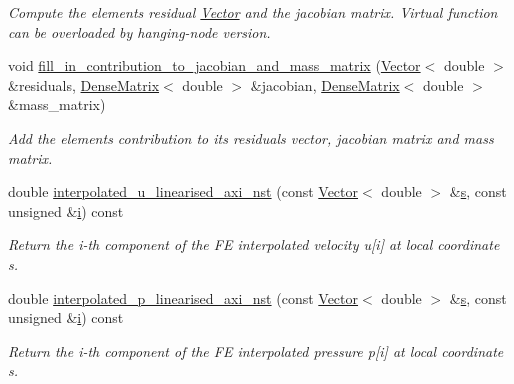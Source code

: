 \begin{DoxyCompactItemize}
\begin{DoxyCompactList}\small\item\em Compute the element\textquotesingle{}s residual \hyperlink{classoomph_1_1Vector}{Vector} and the jacobian matrix. Virtual function can be overloaded by hanging-\/node version. \end{DoxyCompactList}\item 
void \hyperlink{classoomph_1_1LinearisedAxisymmetricNavierStokesEquations_a3dc10c4b27bee432c8536a7213c70050}{fill\+\_\+in\+\_\+contribution\+\_\+to\+\_\+jacobian\+\_\+and\+\_\+mass\+\_\+matrix} (\hyperlink{classoomph_1_1Vector}{Vector}$<$ double $>$ \&residuals, \hyperlink{classoomph_1_1DenseMatrix}{Dense\+Matrix}$<$ double $>$ \&jacobian, \hyperlink{classoomph_1_1DenseMatrix}{Dense\+Matrix}$<$ double $>$ \&mass\+\_\+matrix)
\begin{DoxyCompactList}\small\item\em Add the element\textquotesingle{}s contribution to its residuals vector, jacobian matrix and mass matrix. \end{DoxyCompactList}\item 
double \hyperlink{classoomph_1_1LinearisedAxisymmetricNavierStokesEquations_a8dc5571fe4c2c82e1e2c005fc25b65e6}{interpolated\+\_\+u\+\_\+linearised\+\_\+axi\+\_\+nst} (const \hyperlink{classoomph_1_1Vector}{Vector}$<$ double $>$ \&\hyperlink{cfortran_8h_ab7123126e4885ef647dd9c6e3807a21c}{s}, const unsigned \&\hyperlink{cfortran_8h_adb50e893b86b3e55e751a42eab3cba82}{i}) const
\begin{DoxyCompactList}\small\item\em Return the i-\/th component of the FE interpolated velocity u\mbox{[}i\mbox{]} at local coordinate s. \end{DoxyCompactList}\item 
double \hyperlink{classoomph_1_1LinearisedAxisymmetricNavierStokesEquations_ab76ddaeff2316c47442bb31278012d56}{interpolated\+\_\+p\+\_\+linearised\+\_\+axi\+\_\+nst} (const \hyperlink{classoomph_1_1Vector}{Vector}$<$ double $>$ \&\hyperlink{cfortran_8h_ab7123126e4885ef647dd9c6e3807a21c}{s}, const unsigned \&\hyperlink{cfortran_8h_adb50e893b86b3e55e751a42eab3cba82}{i}) const
\begin{DoxyCompactList}\small\item\em Return the i-\/th component of the FE interpolated pressure p\mbox{[}i\mbox{]} at local coordinate s. \end{DoxyCompactList}\end{DoxyCompactItemize}
